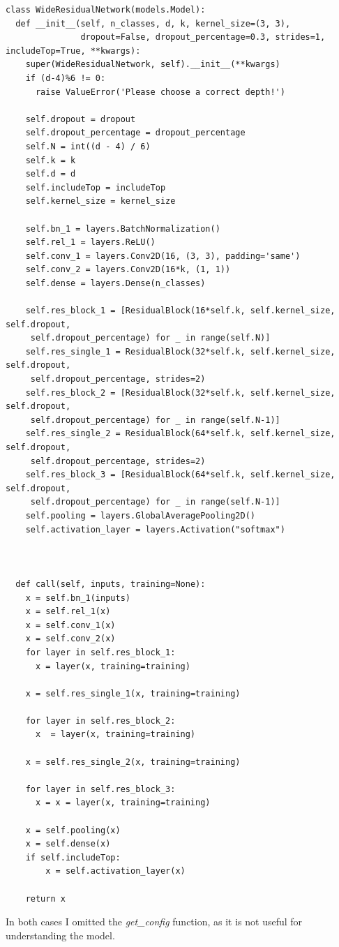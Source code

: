\begin{lstlisting}
class WideResidualNetwork(models.Model):
  def __init__(self, n_classes, d, k, kernel_size=(3, 3),
               dropout=False, dropout_percentage=0.3, strides=1, includeTop=True, **kwargs):
    super(WideResidualNetwork, self).__init__(**kwargs)
    if (d-4)%6 != 0:
      raise ValueError('Please choose a correct depth!')
    
    self.dropout = dropout
    self.dropout_percentage = dropout_percentage
    self.N = int((d - 4) / 6)
    self.k = k
    self.d = d
    self.includeTop = includeTop
    self.kernel_size = kernel_size

    self.bn_1 = layers.BatchNormalization()
    self.rel_1 = layers.ReLU()
    self.conv_1 = layers.Conv2D(16, (3, 3), padding='same')
    self.conv_2 = layers.Conv2D(16*k, (1, 1))
    self.dense = layers.Dense(n_classes)

    self.res_block_1 = [ResidualBlock(16*self.k, self.kernel_size, self.dropout,
     self.dropout_percentage) for _ in range(self.N)]
    self.res_single_1 = ResidualBlock(32*self.k, self.kernel_size, self.dropout,
     self.dropout_percentage, strides=2)
    self.res_block_2 = [ResidualBlock(32*self.k, self.kernel_size, self.dropout,
     self.dropout_percentage) for _ in range(self.N-1)]
    self.res_single_2 = ResidualBlock(64*self.k, self.kernel_size, self.dropout,
     self.dropout_percentage, strides=2)
    self.res_block_3 = [ResidualBlock(64*self.k, self.kernel_size, self.dropout,
     self.dropout_percentage) for _ in range(self.N-1)]
    self.pooling = layers.GlobalAveragePooling2D()
    self.activation_layer = layers.Activation("softmax")



  def call(self, inputs, training=None):
    x = self.bn_1(inputs)
    x = self.rel_1(x)
    x = self.conv_1(x)
    x = self.conv_2(x)
    for layer in self.res_block_1:
      x = layer(x, training=training)

    x = self.res_single_1(x, training=training)

    for layer in self.res_block_2:
      x  = layer(x, training=training)

    x = self.res_single_2(x, training=training)

    for layer in self.res_block_3:
      x = x = layer(x, training=training)

    x = self.pooling(x)
    x = self.dense(x)
    if self.includeTop:
        x = self.activation_layer(x)

    return x

\end{lstlisting}

In both cases I omitted the \textit{get\_config} function, as it is not useful for understanding the model.